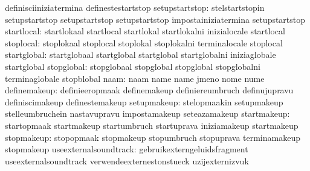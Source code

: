                                   definisciiniziatermina           definestestartstop
                  setupstartstop: stelstartstopin                  setupstartstop
                                  setupstartstop                   setupstartstop
                                  impostainiziatermina             setupstartstop
                      startlocal: startlokaal                      startlocal
                                  startlokal                       startlokalni
                                  inizialocale                     startlocal
                       stoplocal: stoplokaal                       stoplocal
                                  stoplokal                        stoplokalni
                                  terminalocale                    stoplocal
                     startglobal: startglobaal                     startglobal
                                  startglobal                      startglobalni
                                  iniziaglobale                    startglobal
                      stopglobal: stopglobaal                      stopglobal
                                  stopglobal                       stopglobalni
                                  terminaglobale                   stopblobal
                            naam: naam                             name
                                  name                             jmeno
                                  nome                             nume
                    definemakeup: definieeropmaak                  definemakeup
                                  definiereumbruch                 definujupravu
                                  definiscimakeup                  definestemakeup %
                     setupmakeup: stelopmaakin                     setupmakeup
                                  stelleumbruchein                 nastavupravu
                                  impostamakeup                    seteazamakeup
                     startmakeup: startopmaak                      startmakeup
                                  startumbruch                     startuprava
                                  iniziamakeup                     startmakeup
                      stopmakeup: stopopmaak                       stopmakeup
                                  stopumbruch                      stopuprava
                                  terminamakeup                    stopmakeup
           useexternalsoundtrack: gebruikexterngeluidsfragment     useexternalsoundtrack
                                  verwendeexternestonstueck        uzijexternizvuk
